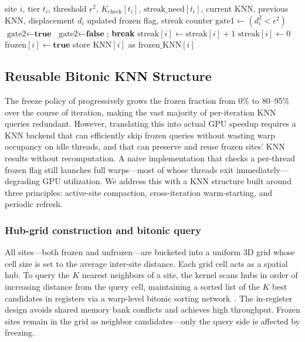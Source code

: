 \begin{algorithm}[t]
\caption{Dual-Gate Freeze Test}
\label{alg:freeze_test}
\begin{algorithmic}[1]
\Require site $i$, tier $t_i$, threshold $\epsilon^2$, $K_{\text{check}}[t_i]$, $\text{streak\_need}[t_i]$, current KNN, previous KNN, displacement $d_i$
\Ensure updated frozen flag, streak counter
\State $\text{gate1} \gets (d_i^2 < \epsilon^2)$
\State $\text{gate2} \gets \textbf{true}$
        \State $\text{gate2} \gets \textbf{false}$; \textbf{break}
    \EndIf
\EndFor
{}
    \State $\text{streak}[i] \gets \text{streak}[i] + 1$
\Else
    \State $\text{streak}[i] \gets 0$
\EndIf
{}
    \State $\text{frozen}[i] \gets \textbf{true}$
    \State store $\text{KNN}[i]$ as $\text{frozen\_KNN}[i]$
\EndIf
\end{algorithmic}
\end{algorithm}

\subsection{Reusable Bitonic KNN Structure}
\label{sec:reusable_knn}

The freeze policy of  progressively grows the frozen fraction from 0\% to 80--95\% over the course of iteration, making the vast majority of per-iteration KNN queries redundant. However, translating this into actual GPU speedup requires a KNN backend that can efficiently skip frozen queries without wasting warp occupancy on idle threads, and that can preserve and reuse frozen sites' KNN results without recomputation. A naive implementation that checks a per-thread frozen flag still launches full warps---most of whose threads exit immediately---degrading GPU utilization. We address this with a KNN structure built around three principles: active-site compaction, cross-iteration warm-starting, and periodic refresh.

\subsubsection{Hub-grid construction and bitonic query}

All sites---both frozen and unfrozen---are bucketed into a uniform 3D grid whose cell size is set to the average inter-site distance. Each grid cell acts as a spatial hub. To query the $K$ nearest neighbors of a site, the kernel scans hubs in order of increasing distance from the query cell, maintaining a sorted list of the $K$ best candidates in registers via a warp-level bitonic sorting network~\cite{batcher1968bitonic}. The in-register design avoids shared memory bank conflicts and achieves high throughput. Frozen sites remain in the grid as neighbor candidates---only the query side is affected by freezing.

